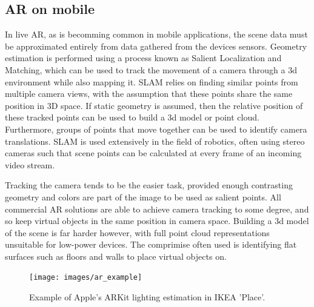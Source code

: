 \documentclass[ %
                    author={Gavin Parker},
                supervisor={Dr. Neill Campbell},
                    degree={MEng},
                     title={Deep Siamese Networks for Illumination Estimation from Stereo Images},
                  subtitle={},
                      type={research},
                      year={2018} ]{dissertation}
\begin{document}
\subsection{AR on mobile}
In live AR, as is becomming common in mobile applications, the scene data must be approximated entirely from data gathered from the devices sensors. Geometry estimation is performed using a process known as Salient Localization and Matching, which can be used to track the movement of a camera through a 3d environment while also mapping it. SLAM relies on finding similar points from multiple camera views, with the assumption that these points share the same position in 3D space. If static geometry is assumed, then the relative position of these tracked points can be used to build a 3d model or point cloud. Furthermore, groups of points that move together can be used to identify camera translations. SLAM is used extensively in the field of robotics, often using stereo cameras such that scene points can be calculated at every frame of an incoming video stream.

Tracking the camera tends to be the easier task, provided enough contrasting geometry and colors are part of the image to be used as salient points. All commercial AR solutions are able to achieve camera tracking to some degree, and so keep virtual objects in the same position in camera space. Building a 3d model of the scene is far harder however, with full point cloud representations unsuitable for low-power devices. The comprimise often used is identifying flat surfaces such as floors and walls to place virtual objects on.
\begin{figure}
\texttt{[image: images/ar\_example]}
\caption{Example of Apple's ARKit lighting estimation in IKEA 'Place'.}
\end{figure}
\end{document}
